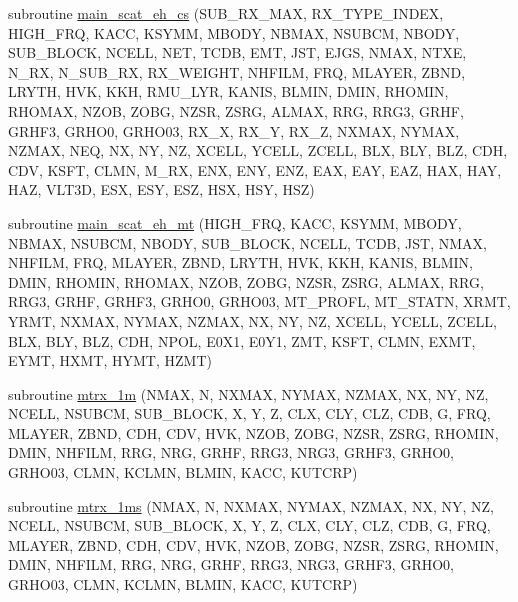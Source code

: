 \begin{DoxyCompactItemize}
\item 
subroutine \hyperlink{Marco_8f90_a631581f8c126c181d87636784b2f6720}{main\+\_\+scat\+\_\+eh\+\_\+cs} (S\+U\+B\+\_\+\+R\+X\+\_\+\+M\+AX, R\+X\+\_\+\+T\+Y\+P\+E\+\_\+\+I\+N\+D\+EX, H\+I\+G\+H\+\_\+\+F\+RQ, K\+A\+CC, K\+S\+Y\+MM, M\+B\+O\+DY, N\+B\+M\+AX, N\+S\+U\+B\+CM, N\+B\+O\+DY, S\+U\+B\+\_\+\+B\+L\+O\+CK, N\+C\+E\+LL, N\+ET, T\+C\+DB, E\+MT, J\+ST, E\+J\+GS, N\+M\+AX, N\+T\+XE, N\+\_\+\+RX, N\+\_\+\+S\+U\+B\+\_\+\+RX, R\+X\+\_\+\+W\+E\+I\+G\+HT, N\+H\+F\+I\+LM, F\+RQ, M\+L\+A\+Y\+ER, Z\+B\+ND, L\+R\+Y\+TH, H\+VK, K\+KH, R\+M\+U\+\_\+\+L\+YR, K\+A\+N\+IS, B\+L\+M\+IN, D\+M\+IN, R\+H\+O\+M\+IN, R\+H\+O\+M\+AX, N\+Z\+OB, Z\+O\+BG, N\+Z\+SR, Z\+S\+RG, A\+L\+M\+AX, R\+RG, R\+R\+G3, G\+R\+HF, G\+R\+H\+F3, G\+R\+H\+O0, G\+R\+H\+O03, R\+X\+\_\+X, R\+X\+\_\+Y, R\+X\+\_\+Z, N\+X\+M\+AX, N\+Y\+M\+AX, N\+Z\+M\+AX, N\+EQ, NX, NY, NZ, X\+C\+E\+LL, Y\+C\+E\+LL, Z\+C\+E\+LL, B\+LX, B\+LY, B\+LZ, C\+DH, C\+DV, K\+S\+FT, C\+L\+MN, M\+\_\+\+RX, E\+NX, E\+NY, E\+NZ, E\+AX, E\+AY, E\+AZ, H\+AX, H\+AY, H\+AZ, V\+L\+T3D, E\+SX, E\+SY, E\+SZ, H\+SX, H\+SY, H\+SZ)
\item 
subroutine \hyperlink{Marco_8f90_a691701461b67027619c9ea8471ee24ea}{main\+\_\+scat\+\_\+eh\+\_\+mt} (H\+I\+G\+H\+\_\+\+F\+RQ, K\+A\+CC, K\+S\+Y\+MM, M\+B\+O\+DY, N\+B\+M\+AX, N\+S\+U\+B\+CM, N\+B\+O\+DY, S\+U\+B\+\_\+\+B\+L\+O\+CK, N\+C\+E\+LL, T\+C\+DB, J\+ST, N\+M\+AX, N\+H\+F\+I\+LM, F\+RQ, M\+L\+A\+Y\+ER, Z\+B\+ND, L\+R\+Y\+TH, H\+VK, K\+KH, K\+A\+N\+IS, B\+L\+M\+IN, D\+M\+IN, R\+H\+O\+M\+IN, R\+H\+O\+M\+AX, N\+Z\+OB, Z\+O\+BG, N\+Z\+SR, Z\+S\+RG, A\+L\+M\+AX, R\+RG, R\+R\+G3, G\+R\+HF, G\+R\+H\+F3, G\+R\+H\+O0, G\+R\+H\+O03, M\+T\+\_\+\+P\+R\+O\+FL, M\+T\+\_\+\+S\+T\+A\+TN, X\+R\+MT, Y\+R\+MT, N\+X\+M\+AX, N\+Y\+M\+AX, N\+Z\+M\+AX, NX, NY, NZ, X\+C\+E\+LL, Y\+C\+E\+LL, Z\+C\+E\+LL, B\+LX, B\+LY, B\+LZ, C\+DH, N\+P\+OL, E0\+X1, E0\+Y1, Z\+MT, K\+S\+FT, C\+L\+MN, E\+X\+MT, E\+Y\+MT, H\+X\+MT, H\+Y\+MT, H\+Z\+MT)
\item 
subroutine \hyperlink{Marco_8f90_a3b9b07c27baabf42e767b59314d43d09}{mtrx\+\_\+1m} (N\+M\+AX, N, N\+X\+M\+AX, N\+Y\+M\+AX, N\+Z\+M\+AX, NX, NY, NZ, N\+C\+E\+LL, N\+S\+U\+B\+CM, S\+U\+B\+\_\+\+B\+L\+O\+CK, X, Y, Z, C\+LX, C\+LY, C\+LZ, C\+DB, G, F\+RQ, M\+L\+A\+Y\+ER, Z\+B\+ND, C\+DH, C\+DV, H\+VK, N\+Z\+OB, Z\+O\+BG, N\+Z\+SR, Z\+S\+RG, R\+H\+O\+M\+IN, D\+M\+IN, N\+H\+F\+I\+LM, R\+RG, N\+RG, G\+R\+HF, R\+R\+G3, N\+R\+G3, G\+R\+H\+F3, G\+R\+H\+O0, G\+R\+H\+O03, C\+L\+MN, K\+C\+L\+MN, B\+L\+M\+IN, K\+A\+CC, K\+U\+T\+C\+RP)
\item 
subroutine \hyperlink{Marco_8f90_a03907a5d9862c74e1506120651d1848a}{mtrx\+\_\+1ms} (N\+M\+AX, N, N\+X\+M\+AX, N\+Y\+M\+AX, N\+Z\+M\+AX, NX, NY, NZ, N\+C\+E\+LL, N\+S\+U\+B\+CM, S\+U\+B\+\_\+\+B\+L\+O\+CK, X, Y, Z, C\+LX, C\+LY, C\+LZ, C\+DB, G, F\+RQ, M\+L\+A\+Y\+ER, Z\+B\+ND, C\+DH, C\+DV, H\+VK, N\+Z\+OB, Z\+O\+BG, N\+Z\+SR, Z\+S\+RG, R\+H\+O\+M\+IN, D\+M\+IN, N\+H\+F\+I\+LM, R\+RG, N\+RG, G\+R\+HF, R\+R\+G3, N\+R\+G3, G\+R\+H\+F3, G\+R\+H\+O0, G\+R\+H\+O03, C\+L\+MN, K\+C\+L\+MN, B\+L\+M\+IN, K\+A\+CC, K\+U\+T\+C\+RP)

\end{DoxyCompactItemize}

